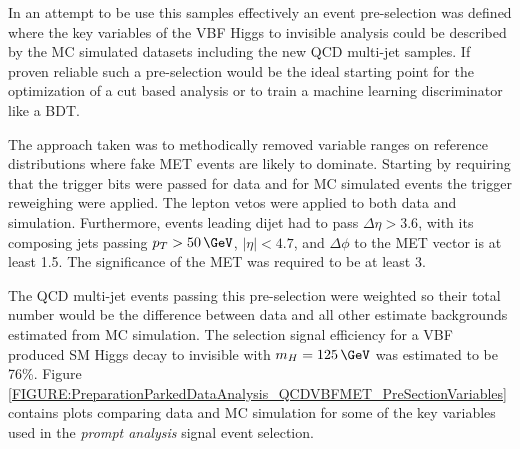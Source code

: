 
In an attempt to be use this samples effectively an event pre-selection was defined where the key variables of the \gls{VBF} Higgs to invisible analysis could be described by the \gls{MC} simulated datasets including the new \gls{QCD} multi-jet samples. If proven reliable such a pre-selection would be the ideal starting point for the optimization of a cut based analysis or to train a machine learning discriminator like a \gls{BDT}.

The approach taken was to methodically removed variable ranges on reference distributions where fake \gls{MET} events are likely to dominate. Starting by requiring that the trigger bits were passed for data and for \gls{MC} simulated events the trigger reweighing were applied. The lepton vetos were applied to both data and simulation. Furthermore, events leading dijet had to pass $\Delta\eta>3.6$, with its composing jets passing $p_T>50\,\GeV$, $|\eta|<4.7$, and $\Delta\phi$ to the \gls{MET} vector is at least 1.5. The significance of the \gls{MET} was required to be at least 3. 

The \gls{QCD} multi-jet events passing this pre-selection were weighted so their total number would be the difference between data and all other estimate backgrounds estimated from \gls{MC} simulation. The selection signal efficiency for a \gls{VBF} produced \gls{SM} Higgs decay to invisible with $m_H=125\,\GeV$ was estimated to be 76\%. Figure \ref{FIGURE:PreparationParkedDataAnalysis_QCDVBFMET_PreSectionVariables} contains plots comparing data and \gls{MC} simulation for some of the key variables used in the \textit{prompt analysis} signal event selection.

%
%

